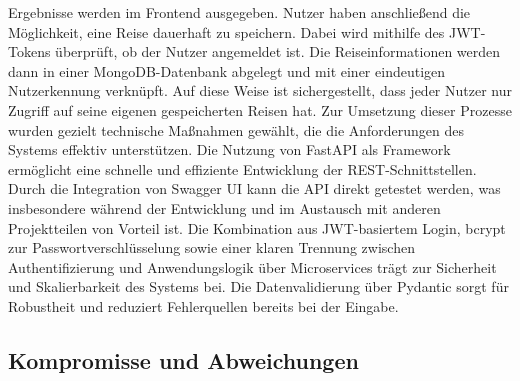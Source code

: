 Ergebnisse werden im Frontend ausgegeben. Nutzer haben anschließend die Möglichkeit, eine
Reise dauerhaft zu speichern. Dabei wird mithilfe des JWT-Tokens überprüft, ob der Nutzer
angemeldet ist. Die Reiseinformationen werden dann in einer MongoDB-Datenbank abgelegt und
mit einer eindeutigen Nutzerkennung verknüpft. Auf diese Weise ist sichergestellt, dass jeder
Nutzer nur Zugriff auf seine eigenen gespeicherten Reisen hat.
Zur Umsetzung dieser Prozesse wurden gezielt technische Maßnahmen gewählt, die die
Anforderungen des Systems effektiv unterstützen. Die Nutzung von FastAPI als Framework
ermöglicht eine schnelle und effiziente Entwicklung der REST-Schnittstellen. Durch die Integration
von Swagger UI kann die API direkt getestet werden, was insbesondere während der Entwicklung
und im Austausch mit anderen Projektteilen von Vorteil ist. Die Kombination aus JWT-basiertem
Login, bcrypt zur Passwortverschlüsselung sowie einer klaren Trennung zwischen
Authentifizierung und Anwendungslogik über Microservices trägt zur Sicherheit und Skalierbarkeit
des Systems bei. Die Datenvalidierung über Pydantic sorgt für Robustheit und reduziert
Fehlerquellen bereits bei der Eingabe.

\subsection{Kompromisse und Abweichungen}
